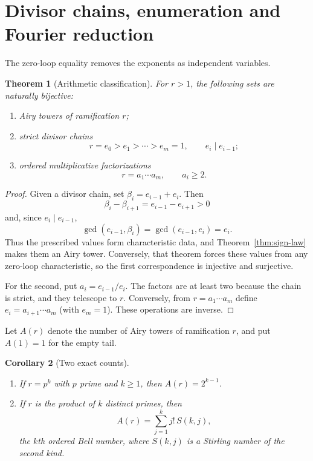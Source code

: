 \documentclass[11pt,a4paper]{amsart}
\theoremstyle{plain}
\newtheorem{theorem}{Theorem}[section]
\newtheorem{corollary}[theorem]{Corollary}
\theoremstyle{definition}
\begin{document}
\section{Divisor chains, enumeration and Fourier reduction}\label{sec:classification}

The zero-loop equality removes the exponents as independent variables.

\begin{theorem}[Arithmetic classification]\label{thm:factor-classification}
For $r>1$, the following sets are naturally bijective:
\begin{enumerate}[label=(\roman*)]
\item Airy towers of ramification $r$;
\item strict divisor chains
\[
 r=e_0>e_1>\cdots>e_m=1,\qquad e_i\mid e_{i-1};
\]
\item ordered multiplicative factorizations
\[
 r=a_1\cdots a_m,\qquad a_i\ge2.
\]
\end{enumerate}
\end{theorem}

\begin{proof}
Given a divisor chain, set $\beta_i=e_{i-1}+e_i$.  Then
\[
 \beta_i-\beta_{i+1}=e_{i-1}-e_{i+1}>0
\]
and, since $e_i\mid e_{i-1}$,
\[
 \gcd(e_{i-1},\beta_i)=\gcd(e_{i-1},e_i)=e_i.
\]
Thus the prescribed values form characteristic data, and
Theorem~\ref{thm:sign-law} makes them an Airy tower.  Conversely, that theorem forces these values
from any zero-loop characteristic, so the first correspondence is injective and surjective.

For the second, put $a_i=e_{i-1}/e_i$.  The factors are at least two because the chain is strict,
and they telescope to $r$.  Conversely, from $r=a_1\cdots a_m$ define
$e_i=a_{i+1}\cdots a_m$ (with $e_m=1$).  These operations are inverse.
\end{proof}

Let $A(r)$ denote the number of Airy towers of ramification $r$, and put $A(1)=1$ for the empty
tail.

\begin{corollary}[Two exact counts]\label{cor:counts}
\begin{enumerate}[label=(\roman*)]
\item If $r=p^k$ with $p$ prime and $k\ge1$, then $A(r)=2^{k-1}$.
\item If $r$ is the product of $k$ distinct primes, then
\[
 A(r)=\sum_{j=1}^k j!\,S(k,j),
\]
the $k$th ordered Bell number, where $S(k,j)$ is a Stirling number of the second kind.
\end{enumerate}
\end{corollary}
\end{document}
